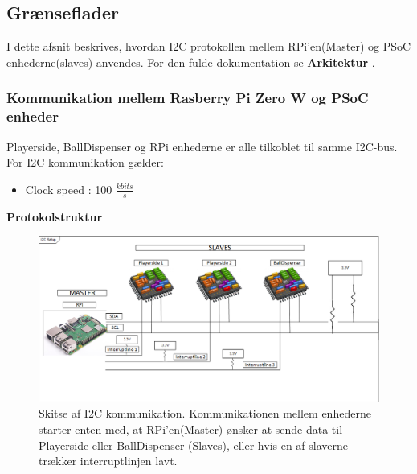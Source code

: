 \documentclass[Rapport/Rapport_main.tex]{subfiles}
\begin{document}
\subsection{Grænseflader}\label{sec:rap_interfaces}
I dette afsnit beskrives, hvordan I2C protokollen mellem RPi'en(Master) og PSoC enhederne(slaves) anvendes. For den fulde dokumentation se \textbf{Arkitektur} .
\subsubsection{Kommunikation mellem Rasberry Pi Zero W og PSoC enheder}
Playerside, BallDispenser og RPi enhederne er alle tilkoblet til samme I2C-bus. For I2C kommunikation gælder: 
\begin{itemize}
    \item Clock speed : 100 $\si{\frac{kbits}{s}}$ 
\end{itemize}
\textbf{Protokolstruktur}
\begin{figure}[H]
    \centering
    \includegraphics[width=\textwidth]{Rapport/Arkitektur/graphics/I2C-Illustration.png}
   \caption{Skitse af I2C kommunikation. Kommunikationen mellem enhederne starter enten med, at RPi'en(Master) ønsker at sende data til Playerside eller BallDispenser (Slaves), eller hvis en af slaverne trækker interruptlinjen lavt.}
    \label{fig:sketch_interrut}
\end{figure}
\end{document}
